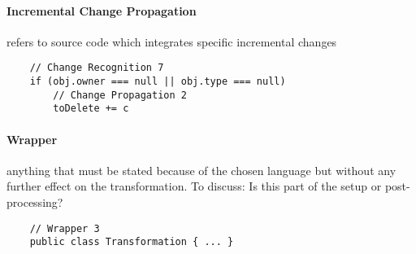 \documentclass{article}
\begin{document}
\paragraph{{Incremental Change Propagation}} refers to source code which integrates specific incremental changes\\ 
        \begin{lstlisting}
    // Change Recognition 7
    if (obj.owner === null || obj.type === null)
        // Change Propagation 2 
        toDelete += c
    \end{lstlisting}

\paragraph{{Wrapper}} anything that must be stated because of the chosen language but without any further effect on the transformation. To discuss: Is this part of the setup or post-processing? \\ 
    \begin{lstlisting}
    // Wrapper 3
    public class Transformation { ... }
    \end{lstlisting}



\end{document}
